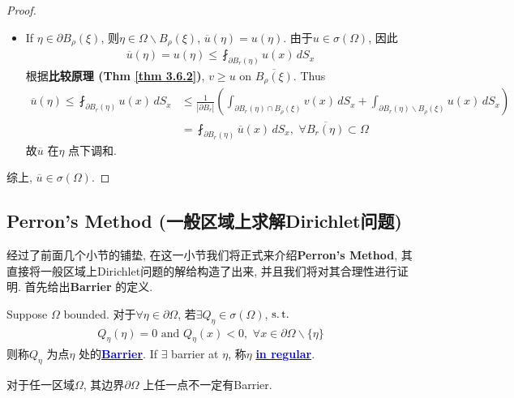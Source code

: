 \begin{thm}
\begin{proof}
\begin{itemize}
				\vspace*{3em}
				
				\item If $\eta \in \partial B_{\rho}(\xi)$, 则$\eta \in \Omega \backslash B_{\rho}(\xi)$, $\overline{u}(\eta) = u(\eta)$. 由于$u \in \sigma(\Omega)$, 因此
				\begin{align*}
					\overline{u}(\eta) 
					= u(\eta) 
					\leq \fint_{\partial B_{r}(\eta)} u(x) \, dS_x 
				\end{align*}
				根据\textbf{比较原理 (Thm \ref{thm 3.6.2})}, $v \geq u$ on $\overline{B_{\rho}(\xi)}$. Thus
				\begin{align*}
					\overline{u}(\eta) 
					\leq \fint_{\partial B_{r}(\eta)} u(x) \, dS_x 
					&\leq \frac{1}{| \partial B_r |} \left( \int_{\partial B_r(\eta) \cap B_\rho (\xi)} v(x) \, dS_x + \int_{\partial B_{r}(\eta) \backslash B_{\rho}(\xi)} u(x) \, dS_x \right) \\
					&= \fint_{\partial B_{r}(\eta)} \overline{u}(x) \, dS_x , \,\, \forall \overline{B_{r}(\eta)} \subset \Omega
				\end{align*}
				故$\overline{u}$ 在$\eta$ 点下调和. 
			\end{itemize}
			综上, $\overline{u} \in \sigma(\Omega)$. 
		\end{proof}
	\end{thm}

\newpage

\subsection{Perron's Method (一般区域上求解Dirichlet问题)}
	经过了前面几个小节的铺垫, 在这一小节我们将正式来介绍\textbf{Perron's Method}, 其直接将一般区域上Dirichlet问题的解给构造了出来, 并且我们将对其合理性进行证明. 首先给出\textbf{Barrier} 的定义. 
	
	\vspace*{1em}
	
	\begin{defn}\label{def 3.6.2}
		Suppose $\Omega$ bounded. 对于$\forall \eta \in \partial \Omega$, 若$\exists Q_\eta \in \sigma(\Omega)$, $\operatorname{s.t.}$ 
		\begin{align*}
			Q_\eta(\eta) = 0 \,\, \text{and} \,\, Q_\eta(x) < 0 , \,\, \forall x \in \partial \Omega \backslash \{ \eta \}
		\end{align*}
		则称$Q_\eta$ 为点$\eta$ 处的\underline{\textcolor{blue}{\textbf{Barrier}}}. If $\exists$ barrier at $\eta$, 称$\eta$ \underline{\textcolor{blue}{\textbf{in regular}}}. 
		
		\vspace*{2em}
		
		\begin{rmk}
			对于任一区域$\Omega$, 其边界$\partial \Omega$ 上任一点不一定有Barrier. 
		\end{rmk}
	\end{defn}
	
